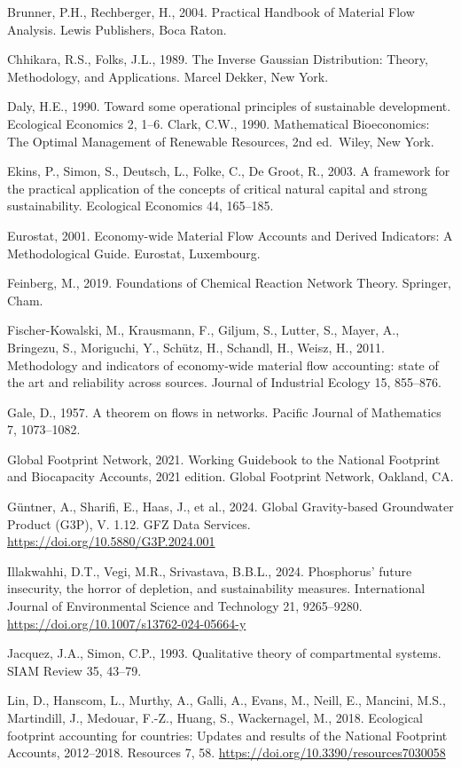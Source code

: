 \documentclass[11pt]{article}
\begin{document}
Brunner, P.H., Rechberger, H., 2004. Practical Handbook of Material Flow
Analysis. Lewis Publishers, Boca Raton.

Chhikara, R.S., Folks, J.L., 1989. The Inverse Gaussian Distribution:
Theory, Methodology, and Applications. Marcel Dekker, New York.

Daly, H.E., 1990. Toward some operational principles of sustainable
development. Ecological Economics 2, 1--6. Clark, C.W., 1990.
Mathematical Bioeconomics: The Optimal Management of Renewable
Resources, 2nd ed.~Wiley, New York.

Ekins, P., Simon, S., Deutsch, L., Folke, C., De Groot, R., 2003. A
framework for the practical application of the concepts of critical
natural capital and strong sustainability. Ecological Economics 44,
165--185.

Eurostat, 2001. Economy-wide Material Flow Accounts and Derived
Indicators: A Methodological Guide. Eurostat, Luxembourg.

Feinberg, M., 2019. Foundations of Chemical Reaction Network Theory.
Springer, Cham.

Fischer-Kowalski, M., Krausmann, F., Giljum, S., Lutter, S., Mayer, A.,
Bringezu, S., Moriguchi, Y., Sch\"utz, H., Schandl, H., Weisz, H., 2011.
Methodology and indicators of economy-wide material flow accounting:
state of the art and reliability across sources. Journal of Industrial
Ecology 15, 855--876.

Gale, D., 1957. A theorem on flows in networks. Pacific Journal of Mathematics 7, 1073--1082.

Global Footprint Network, 2021. Working Guidebook to the National Footprint and Biocapacity Accounts, 2021 edition. Global Footprint Network, Oakland, CA.

G\"untner, A., Sharifi, E., Haas, J., et al., 2024. Global Gravity-based
Groundwater Product (G3P), V. 1.12. GFZ Data Services.
\url{https://doi.org/10.5880/G3P.2024.001}

Illakwahhi, D.T., Vegi, M.R., Srivastava, B.B.L., 2024. Phosphorus'
future insecurity, the horror of depletion, and sustainability measures.
International Journal of Environmental Science and Technology 21,
9265--9280. \url{https://doi.org/10.1007/s13762-024-05664-y}

Jacquez, J.A., Simon, C.P., 1993. Qualitative theory of compartmental
systems. SIAM Review 35, 43--79.

Lin, D., Hanscom, L., Murthy, A., Galli, A., Evans, M., Neill, E.,
Mancini, M.S., Martindill, J., Medouar, F.-Z., Huang, S., Wackernagel,
M., 2018. Ecological footprint accounting for countries: Updates and
results of the National Footprint Accounts, 2012--2018. Resources 7, 58.
\url{https://doi.org/10.3390/resources7030058}
\end{document}
